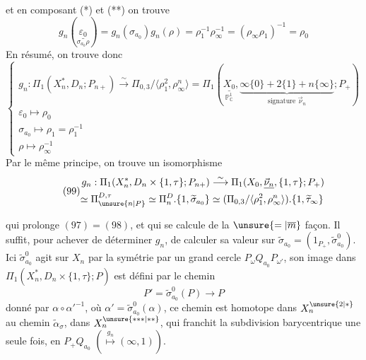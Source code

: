 et en composant (*) et (**) on trouve
\[
g_n(\underset{\sigma_{a_0}\rho}{\underline{\varepsilon_0}})
=g_n(\sigma_{a_0})g_n(\rho)
=\rho_1^{-1}\rho_\infty^{-1}
=(\rho_\infty\rho_1)^{-1}=\rho_0
\]
En résumé, on trouve donc
\[
\tag{98}
\left\{
\begin{gathered}
g_n:\Pi_1(X_n^*,D_n;P_{n+})\overset\sim\longrightarrow
\Pi_{0,3}/\langle\rho_1^2,\rho_\infty^n\rangle
=\Pi_1(\underset{\mathbb P^1_{\mathbb C}}{\underline{X_0}},
\underbrace{\infty\{0\}+2\{1\}+n\{\infty\}}_{\text{signature }\vec\nu_n};P_+)\\
\varepsilon_0\longmapsto\rho_0\\
\sigma_{a_0}\longmapsto\rho_1=\rho_1^{-1}\\
\rho\longmapsto\rho_\infty^{-1}
\end{gathered}
\right.
\]
Par le même principe, on trouve un isomorphisme
\[
\tag{99}
\begin{aligned}
g_n:\Pi_1(X_n^*,D_n\times\{1,\tau\};P_{n+})
&\overset\sim\longrightarrow\Pi_1(X_0,\underline{\vec\nu_n},\{1,\tau\};P_+)\\
\simeq\Pi_{\unsure{n|P}}^{D,\tau}\simeq\Pi_n^D.\{1,\widetilde\sigma_{a_0}\}
&\simeq(\Pi_{0,3}/\langle\rho_1^2,\rho_\infty^n\rangle).\{1,\widetilde\tau_\infty\}
\end{aligned}
\]


qui prolonge $(97)=(98)$, et qui se calcule de la $\unsure{=|\overline m}$ façon. Il suffit, pour achever de déterminer $g_n$, de calculer sa valeur sur 
$\widetilde\sigma_{a_0}=(1_{P_+},\widetilde\sigma^0_{a_0})$.
Ici $\widetilde\sigma^0_{a_0}$ agit sur $X_n$ par la symétrie par un grand cercle $P_\omega Q_{a_0}P_{\omega'}$,  son image dans
$\Pi_1(X_n^*,D_n\times\{1,\tau\};P)$ est défini par le chemin 
\[
P'=\widetilde\sigma^0_{a_0}(P)\longrightarrow P
\]
donné par $\alpha\circ\alpha'^{-1}$, où $\alpha'=\widetilde\sigma^0_{a_0}(\alpha)$, ce chemin est homotope dans $X_n^{\unsure{2|*}}$ au chemin $\widetilde\alpha_\sigma$,  dans $X_n^{\unsure{***|**}}$, qui franchit la subdivision barycentrique une seule fois, en $P_+Q_{a_0}$ $(\overset{g_n}\longmapsto(\infty,1))$.

